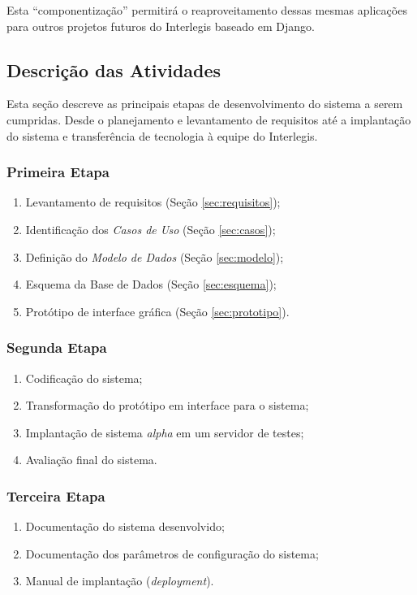 Esta ``componentização'' permitirá o reaproveitamento dessas mesmas
aplicações para outros projetos futuros do Interlegis baseado em
Django.

\subsection{Descrição das Atividades}
Esta seção descreve as principais etapas de desenvolvimento do sistema
a serem cumpridas. Desde o planejamento e levantamento de requisitos
até a implantação do sistema e transferência de tecnologia à equipe do
Interlegis.

\subsubsection{Primeira Etapa}
\begin{enumerate}
\item Levantamento de requisitos (Seção \ref{sec:requisitos});
\item Identificação dos \emph{Casos de Uso} (Seção \ref{sec:casos});
\item Definição do \emph{Modelo de Dados} (Seção \ref{sec:modelo});
\item Esquema da Base de Dados (Seção \ref{sec:esquema});
\item Protótipo de interface gráfica (Seção \ref{sec:prototipo}).
\end{enumerate}

\subsubsection{Segunda Etapa}
\begin{enumerate}
\item Codificação do sistema;
\item Transformação do protótipo em interface para o sistema;
\item Implantação de sistema \textit{alpha} em um servidor de testes;
\item Avaliação final do sistema.
\end{enumerate}

\subsubsection{Terceira Etapa}
\begin{enumerate}
\item Documentação do sistema desenvolvido;
\item Documentação dos parâmetros de configuração do sistema;
\item Manual de implantação (\textit{deployment}).
\end{enumerate}

